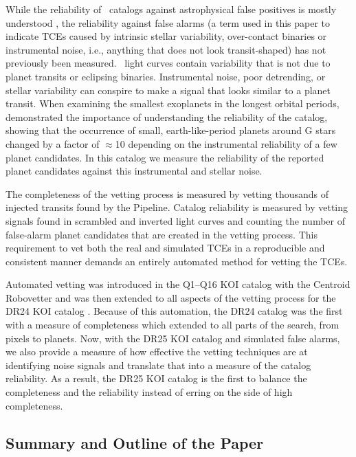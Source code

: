 While the reliability of \Kepler\ catalogs against astrophysical false positives is mostly understood \citep[see e.g.][]{Morton2016}, the reliability against false alarms (a term used in this paper to indicate TCEs caused by intrinsic stellar variability, over-contact binaries or instrumental noise, i.e., anything that does not look transit-shaped) has not previously been measured.  \Kepler\ light curves contain variability that is not due to planet transits or eclipsing binaries.  Instrumental noise, poor detrending, or stellar variability can conspire to make a signal that looks similar to a planet transit. When examining the smallest exoplanets in the longest orbital periods, \citet{Burke2015} demonstrated the importance of understanding the reliability of the catalog, showing that the occurrence of small, earth-like-period planets around G stars changed by a factor of $\approx$10 depending on the instrumental reliability of a few planet candidates.  In this catalog we measure the reliability of the reported planet candidates against this instrumental and stellar noise.  

The completeness of the vetting process is measured by vetting thousands of injected transits found by the \Kepler{} Pipeline. Catalog reliability is measured by vetting signals found in scrambled and inverted \Kepler{} light curves and counting the number of false-alarm planet candidates that are created in the vetting process. This requirement to vet both the real and simulated TCEs in a reproducible and consistent manner demands an entirely automated method for vetting the TCEs.  

Automated vetting was introduced in the Q1--Q16 KOI catalog \citep{Mullally2015cat} with the Centroid Robovetter and was then extended to all aspects of the vetting process for the DR24 KOI catalog \citep{Coughlin2016}. Because of this automation, the DR24 catalog was the first with a measure of completeness which extended to all parts of the search, from pixels to planets.  Now, with the DR25 KOI catalog and simulated false alarms, we also provide a measure of how effective the vetting techniques are at identifying noise signals and translate that into a measure of the catalog reliability. As a result, the DR25 KOI catalog is the first to balance the completeness and the reliability instead of erring on the side of high completeness. 

\subsection{Summary and Outline of the Paper}

